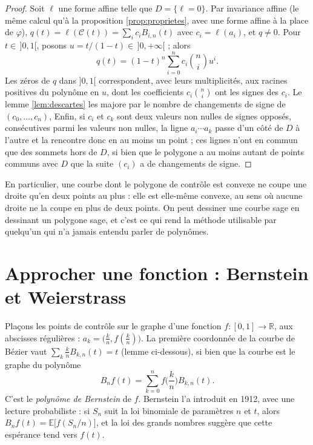 \documentclass[11pt,a4paper]{article}
\theoremstyle{plain}
\theoremstyle{definition}
\theoremstyle{remark}
\newcommand{\R}{\mathbb{R}}
\newcommand{\C}{\mathcal{C}}
\begin{document}
\begin{proof}
Soit $\ell$ une forme affine telle que $D=\{\ell=0\}$. Par invariance affine (le même calcul qu'à la proposition \ref{prop:proprietes}, avec une forme affine à la place de $\varphi$), $q(t)=\ell(\C(t))=\sum_ic_iB_{i,n}(t)$ avec $c_i=\ell(a_i)$, et $q\neq0$. Pour $t\in\,]0,1[$, posons $u=t/(1-t)\in\,]0,+\infty[$ ; alors
\[
  q(t)=(1-t)^n\sum_{i=0}^nc_i\binom ni u^i .
\]
Les zéros de $q$ dans $]0,1[$ correspondent, avec leurs multiplicités, aux racines positives du polynôme en $u$, dont les coefficients $c_i\binom ni$ ont les signes des $c_i$. Le lemme \ref{lem:descartes} les majore par le nombre de changements de signe de $(c_0,\dots,c_n)$, Enfin, si $c_i$ et $c_k$ sont deux valeurs non nulles de signes opposés, consécutives parmi les valeurs non nulles, la ligne $a_i\cdots a_k$ passe d'un côté de $D$ à l'autre et la rencontre donc en au moins un point ; ces lignes n'ont en commun que des sommets hors de $D$, si bien que le polygone a au moins autant de points communs avec $D$ que la suite $(c_i)$ a de changements de signe.
\end{proof}

En particulier, une courbe dont le polygone de contrôle est convexe ne coupe une droite qu'en deux points au plus : elle est elle-même convexe, au sens où aucune droite ne la coupe en plus de deux points. On peut dessiner une courbe sage en dessinant un polygone sage, et c'est ce qui rend la méthode utilisable par quelqu'un qui n'a jamais entendu parler de polynômes.

\section{Approcher une fonction : Bernstein et Weierstrass}

Plaçons les points de contrôle sur le graphe d'une fonction $f:[0,1]\to\R$, aux abscisses régulières : $a_k=\big(\frac kn,f(\frac kn)\big)$. La première coordonnée de la courbe de Bézier vaut $\sum_k\frac knB_{k,n}(t)=t$ (lemme ci-dessous), si bien que la courbe est le graphe du polynôme
\[
  B_nf(t)=\sum_{k=0}^nf\Big(\frac kn\Big)B_{k,n}(t) .
\]
C'est le \emph{polynôme de Bernstein} de $f$. Bernstein l'a introduit en 1912, avec une lecture probabiliste : si $S_n$ suit la loi binomiale de paramètres $n$ et $t$, alors $B_nf(t)=\mathbb E\big[f(S_n/n)\big]$, et la loi des grands nombres suggère que cette espérance tend vers $f(t)$.
\end{document}
